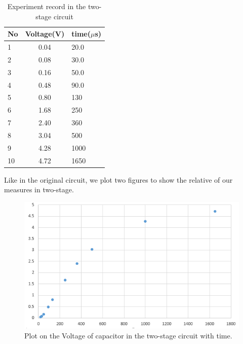 \begin{table}[!htbp]\centering
	\caption{Experiment record in the two-stage circuit}
	\renewcommand\arraystretch{1.5}
	\begin{tabular}{lcl}
		\toprule
		No		&Voltage(V)	&time($\mu$s)	\\
		\midrule
		1		&0.04		&20.0		\\

		2		&0.08		&30.0		\\
		
		3		&0.16		&50.0		\\
		
		4		&0.48		&90.0		\\
		
		5		&0.80		&130		\\
		
		6		&1.68		&250		\\
		
		7		&2.40		&360		\\
		
		8		&3.04		&500		\\
		
		9		&4.28		&1000		\\
		
		10		&4.72		&1650		\\
		\bottomrule
	\end{tabular}
\end{table}
\phantom{ } Like in the original circuit, we plot two figures to show the relative of our measures in two-stage.
\begin{figure}[!htbp]
	\centering %
	\includegraphics[width=\linewidth]{images/2_5.PNG} %
	\caption{Plot on the Voltage of capacitor in the two-stage circuit with time.} %
	\label{fig:2.5} %
\end{figure}
